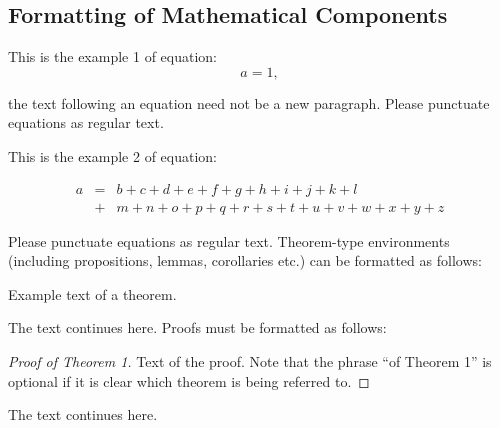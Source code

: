 \begin{paracol}{2}
\subsection{Formatting of Mathematical Components}

This is the example 1 of equation:
\begin{equation}
a = 1,
\end{equation}

the text following an equation need not be a new paragraph. Please punctuate equations as regular text.

This is the example 2 of equation:
\end{paracol}
\nointerlineskip
\begin{eqnarray}
a &=& b + c + d + e + f + g + h + i + j + k + l\nonumber \\
 &+& m + n + o + p + q + r + s + t + u + v + w + x + y + z %
\end{eqnarray}






\begin{paracol}{2}
\linenumbers
\switchcolumn
Please punctuate equations as regular text. Theorem-type environments (including propositions, lemmas, corollaries etc.) can be formatted as follows:
\begin{Theorem}
Example text of a theorem.
\end{Theorem}

The text continues here. Proofs must be formatted as follows:

\begin{proof}[Proof of Theorem 1]
Text of the proof. Note that the phrase ``of Theorem 1'' is optional if it is clear which theorem is being referred to.
\end{proof}
The text continues here.

\end{paracol}





